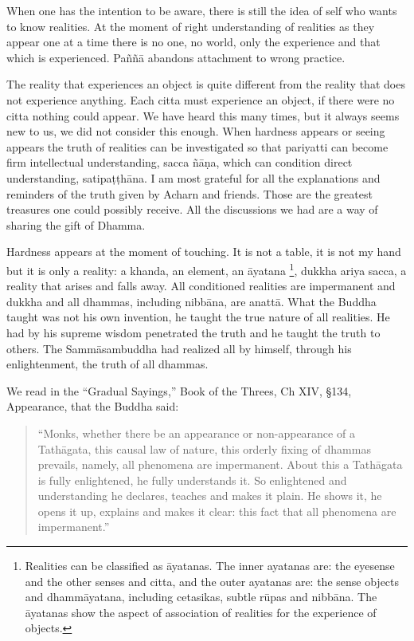 When one has the intention to be aware, there is still the idea of self
who wants to know realities. At the moment of right understanding of
realities as they appear one at a time there is no one, no world, only
the experience and that which is experienced. Paññā abandons attachment
to wrong practice.

The reality that experiences an object is quite different from the
reality that does not experience anything. Each citta must experience an
object, if there were no citta nothing could appear. We have heard this
many times, but it always seems new to us, we did not consider this
enough. When hardness appears or seeing appears the truth of realities
can be investigated so that pariyatti can become firm intellectual
understanding, sacca ñāṇa, which can condition direct understanding,
satipaṭṭhāna. I am most grateful for all the explanations and reminders
of the truth given by Acharn and friends. Those are the greatest
treasures one could possibly receive. All the discussions we had are a
way of sharing the gift of Dhamma.

Hardness appears at the moment of touching. It is not a table, it is not
my hand but it is only a reality: a khanda, an element, an āyatana
\footnote{Realities can be
classified as āyatanas. The inner ayatanas are: the eyesense and the
other senses and citta, and the outer ayatanas are: the sense objects
and dhammāyatana, including cetasikas, subtle rūpas and nibbāna. The
āyatanas show the aspect of association of realities for the experience
of objects.}, dukkha ariya sacca, a
reality that arises and falls away. All conditioned realities are
impermanent and dukkha and all dhammas, including nibbāna, are anattā.
What the Buddha taught was not his own invention, he taught the true
nature of all realities. He had by his supreme wisdom penetrated the
truth and he taught the truth to others. The Sammāsambuddha had realized
all by himself, through his enlightenment, the truth of all dhammas.

We read in the ``Gradual Sayings,'' Book of the Threes, Ch XIV, §134,
Appearance, that the Buddha said:

\begin{quote}
``Monks, whether there be an appearance or non-appearance of a
Tathāgata, this causal law of nature, this orderly fixing of dhammas
prevails, namely, all phenomena are impermanent. About this a Tathāgata
is fully enlightened, he fully understands it. So enlightened and
understanding he declares, teaches and makes it plain. He shows it, he
opens it up, explains and makes it clear: this fact that all phenomena
are impermanent.''
\end{quote}

